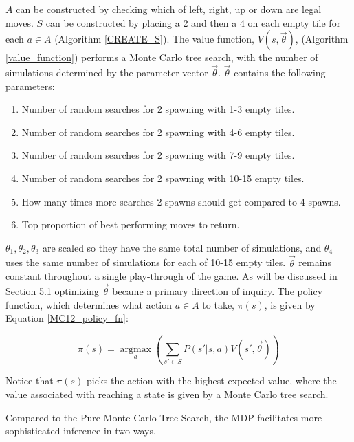 \documentclass{article}
\DeclareMathOperator*{\argmax}{argmax}
\begin{document}
$A$ can be constructed by checking which of left, right, up or down are legal moves. $S$ can be constructed by placing a 2 and then a 4 on each empty tile for each $a \in A$ (Algorithm \ref{CREATE_S}). The value function, $V(s, \vec{\theta})$,  (Algorithm \ref{value_function}) performs a Monte Carlo tree search, with the number of simulations determined by the parameter vector $\vec{\theta}$.  $\vec{\theta}$ contains the following parameters:
\begin{enumerate}
	\item Number of random searches for 2 spawning with 1-3 empty tiles.
	\item Number of random searches for 2 spawning with 4-6 empty tiles.
	\item Number of random searches for 2 spawning with 7-9 empty tiles.
	\item Number of random searches for 2 spawning with 10-15 empty tiles.
	\item How many times more searches 2 spawns should get compared to 4 spawns.
	\item Top proportion of best performing moves to return.
\end{enumerate}

$\theta_1, \theta_2, \theta_3$ are scaled so they have the same total number of simulations, and $\theta_4$ uses the same number of simulations for each of 10-15 empty tiles.  $\vec{\theta}$ remains constant throughout a single play-through of the game.  As will be discussed in Section 5.1 optimizing $\vec{\theta}$ became a primary direction of inquiry. The policy function, which determines what action $a \in A$ to take, $\pi(s)$, is given by Equation \ref{MC12_policy_fn}:

\begin{equation}
\label{MC12_policy_fn}
\pi(s) = \argmax\limits_{a}\left( \sum\limits_{s' \in S} P(s'|s, a)V(s', \vec{\theta}) \right)
\end{equation}


Notice that $\pi(s)$ picks the action with the highest expected value, where the value associated with reaching a state is given by a Monte Carlo tree search.


Compared to the Pure Monte Carlo Tree Search, the MDP facilitates more sophisticated inference in two ways. 
\end{document}
